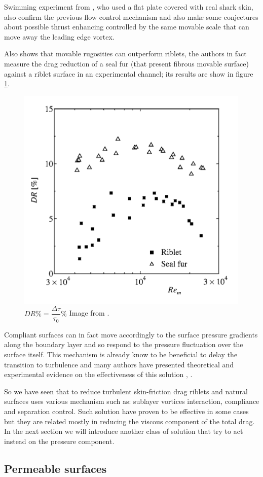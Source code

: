 Swimming experiment from \cite{Oeffner785}, who used a flat plate covered with real shark skin, also confirm the previous flow control mechanism and also make some conjectures about possible thrust enhancing controlled by the same movable scale that can move away the leading edge vortex.

Also \citet{itoh2006turbulent} shows that movable rugosities can outperform riblets, the authors in fact measure the drag reduction of a seal fur (that present fibrous movable surface) against a riblet surface in an experimental channel; its results are show in figure \ref{fig:seal}.

\begin{figure}[h]
\centering
\includegraphics[width=0.5\linewidth]{chapter_1/seal}
\caption{$DR \% = \dfrac{ \Delta \tau}{\tau_{0}} \%$ Image from \citet{itoh2006turbulent}.}
\label{fig:seal}
\end{figure}


Compliant surfaces can in fact move accordingly to the surface pressure gradients along the boundary layer and so respond to the pressure fluctuation over the surface itself.
This mechanism is already know to be beneficial to delay the transition to turbulence and many authors have presented theoretical and experimental evidence on the effectiveness of this solution \cite{carpenter1990status}, \cite{bushnell1977effect}.

So we have seen that to reduce turbulent skin-friction drag riblets and natural surfaces uses various mechanism such as: sublayer vortices interaction, compliance and separation control.
Such solution have proven to be effective in some cases but they are related mostly in reducing the viscous component of the total drag.
In the next section we will introduce another class of solution that try to act instead on the pressure component.


\subsection{Permeable surfaces}

